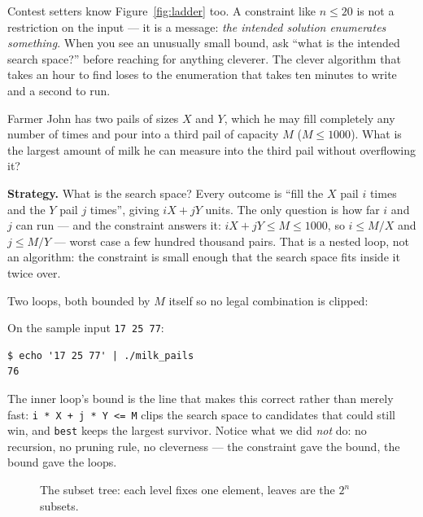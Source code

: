 \begin{remark}\label{rem:smalln}
Contest setters know Figure~\ref{fig:ladder} too. A constraint like
$n \le 20$ is not a restriction on the input --- it is a message: \emph{the
intended solution enumerates something}. When you see an unusually small
bound, ask ``what is the intended search space?'' before reaching for anything
cleverer. The clever algorithm that takes an hour to find loses to the
enumeration that takes ten minutes to write and a second to run.
\end{remark}

\begin{example}\label{ex:milkpails}
Farmer John has two pails of sizes $X$ and $Y$, which he may fill completely
any number of times and pour into a third pail of capacity $M$ ($M \le 1000$).
What is the largest amount of milk he can measure into the third pail without
overflowing it?
\par\smallskip
\textbf{Strategy.} What is the search space? Every outcome is ``fill the
$X$ pail $i$ times and the $Y$ pail $j$ times'', giving $iX + jY$ units. The
only question is how far $i$ and $j$ can run --- and the constraint answers
it: $iX + jY \le M \le 1000$, so $i \le M/X$ and $j \le M/Y$ --- worst
case a few hundred thousand pairs. That is a nested loop, not an algorithm: the constraint is
small enough that the search space fits inside it twice over.
\par\smallskip
\begin{solution}
Two loops, both bounded by $M$ itself so no legal combination is clipped:

On the sample input \texttt{17 25 77}:
\begin{lstlisting}[numbers=none]
$ echo '17 25 77' | ./milk_pails
76
\end{lstlisting}
The inner loop's bound is the line that makes this correct rather than merely
fast: \texttt{i * X + j * Y <= M} clips the search space to candidates that
could still win, and \texttt{best} keeps the largest survivor. Notice what we
did \emph{not} do: no recursion, no pruning rule, no cleverness --- the
constraint gave the bound, the bound gave the loops.
\end{solution}
\end{example}


\begin{figure}[htbp]\centering

\caption{The subset tree: each level fixes one element, leaves are the $2^{n}$ subsets.}
\label{fig:subsets}
\end{figure}

